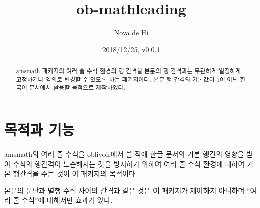 \documentclass[a4paper,amsmath]{oblivoir}
\newcommand\pkg[1]{\textsf{#1}}
\begin{document}
\title{ob-mathleading}
\author{Nova de Hi}
\date{2018/12/25, v0.0.1}

\maketitle

\begin{abstract}
\pkg{amsmath} 패키지의 여러 줄 수식 환경의 행 간격을 본문의 행 간격과는 무관하게 일정하게
고정하거나 임의로 변경할 수 있도록 하는 패키지이다. 본문 행 간격의 기본값이 $1$이 아닌 
한국어 문서에서 활용할 목적으로 제작하였다.
\end{abstract}

\tableofcontents*

\section{목적과 기능}

\pkg{amsmath}의 여러 줄 수식을 \pkg{oblivoir}에서 쓸 적에 한글 문서의 기본 행간의 영향을 받아
수식의 행간격이 느슨해지는 것을 방지하기 위하여 여러 줄 수식 환경에 대하여 기본 행간격을 주는 것이 
이 패키지의 목적이다.

본문의 문단과 별행 수식 사이의 간격과 같은 것은 이 패키지가 제어하지 아니하며 ``여러 줄 수식''에 대해서만
효과가 있다.
\end{document}
